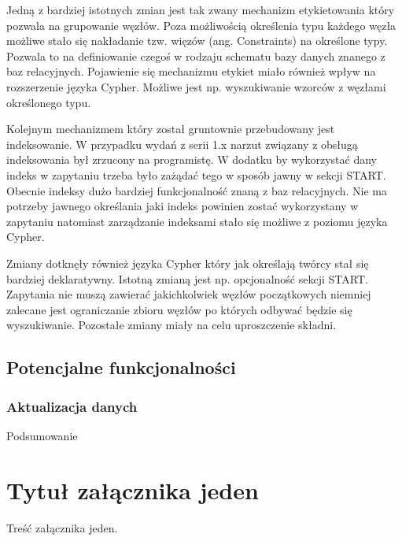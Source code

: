 \documentclass[brudnopis]{xmgr}
\begin{document}
Jedną z bardziej istotnych zmian jest tak zwany mechanizm etykietowania który pozwala na grupowanie węzłów. Poza możliwością określenia typu każdego węzła możliwe stało się nakładanie tzw. więzów (ang. Constraints) na określone typy. Pozwala to na definiowanie czegoś w rodzaju schematu bazy danych znanego z baz relacyjnych. Pojawienie się mechanizmu etykiet miało również wpływ na rozszerzenie języka Cypher. Możliwe jest np. wyszukiwanie wzorców z węzłami określonego typu.

Kolejnym mechanizmem który został gruntownie przebudowany jest indeksowanie. W przypadku wydań z serii 1.x narzut związany z obsługą indeksowania był zrzucony na programistę. W dodatku by wykorzystać dany indeks w zapytaniu trzeba było zażądać tego w sposób jawny w sekcji START. Obecnie indeksy dużo bardziej funkcjonalność znaną z baz relacyjnych. Nie ma potrzeby jawnego określania jaki indeks powinien zostać wykorzystany w zapytaniu natomiast zarządzanie indeksami stało się możliwe z poziomu języka Cypher.

Zmiany dotknęły również języka Cypher który jak określają twórcy stał się bardziej deklaratywny. Istotną zmianą jest np. opcjonalność sekcji START. Zapytania nie muszą zawierać jakichkolwiek węzłów początkowych niemniej zalecane jest ograniczanie zbioru węzłów po których odbywać będzie się wyszukiwanie. Pozostałe zmiany miały na celu uproszczenie składni.

\section{Potencjalne funkcjonalności}

\subsection{Aktualizacja danych}

\summary
Podsumowanie

\appendix
\chapter{Tytuł załącznika jeden}

Treść załącznika jeden.




\listoftables

\listoffigures

\oswiadczenie
\end{document}
